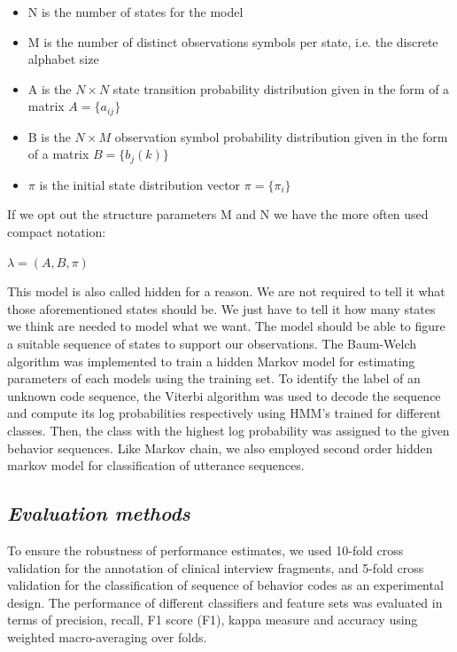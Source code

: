 \documentclass{amia}
\begin{document}
\begin{itemize}
\item N is the number of states for the model
\item M is the number of distinct observations symbols per state, i.e. the discrete alphabet size
\item A is the $N\times N$ state transition probability distribution given in the form of a matrix $A = \{a_{ij}\}$
\item B is the $N\times M$ observation symbol probability distribution given in the form of a matrix $B = \{b_j(k)\}$
\item $\pi$ is the initial state distribution vector $\pi = \{\pi_i\}$
\end{itemize}

If we opt out the structure parameters M and N we have the more often used compact notation:

\begin{center}
$\lambda = (A, B, \pi)$
\end{center} 

This model is also called hidden for a reason. We are not required to tell it what those aforementioned states should be. We just have to tell it how many states we think are needed to model what we want. The model should be able to figure a suitable sequence of states to support our observations. The Baum-Welch algorithm was implemented to train a hidden Markov model for estimating parameters of each models using the training set. To identify the label of an unknown code sequence, the Viterbi algorithm was used to decode the sequence and compute its log probabilities respectively using HMM's trained for different classes. Then, the class with the highest log probability was assigned to the given behavior sequences. Like Markov chain, we also employed second order hidden markov model for classification of utterance sequences.   

\subsection*{\textit{Evaluation methods}}
To ensure the robustness of performance estimates, we used 10-fold cross validation for the annotation of clinical interview fragments, and 5-fold cross validation for the classification of sequence of behavior codes \cite{} as an experimental design. The performance of different classifiers and feature sets was evaluated in terms of precision, recall, F1 score (F1), kappa measure and accuracy using weighted macro-averaging over folds.
\end{document}
